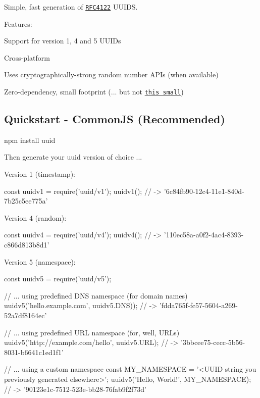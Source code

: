 Simple, fast generation of \href{http://www.ietf.org/rfc/rfc4122.txt}{\tt R\+F\+C4122} U\+U\+I\+DS.

Features\+:


\begin{DoxyItemize}
\item Support for version 1, 4 and 5 U\+U\+I\+Ds
\item Cross-\/platform
\item Uses cryptographically-\/strong random number A\+P\+Is (when available)
\item Zero-\/dependency, small footprint (... but not \href{https://gist.github.com/982883}{\tt this small})
\end{DoxyItemize}

\subsection*{Quickstart -\/ Common\+JS (Recommended)}


\begin{DoxyCode}
npm install uuid
\end{DoxyCode}


Then generate your uuid version of choice ...

Version 1 (timestamp)\+:


\begin{DoxyCode}
const uuidv1 = require('uuid/v1');
uuidv1(); // -> '6c84fb90-12c4-11e1-840d-7b25c5ee775a'
\end{DoxyCode}


Version 4 (random)\+:


\begin{DoxyCode}
const uuidv4 = require('uuid/v4');
uuidv4(); // -> '110ec58a-a0f2-4ac4-8393-c866d813b8d1'
\end{DoxyCode}


Version 5 (namespace)\+:


\begin{DoxyCode}
const uuidv5 = require('uuid/v5');

// ... using predefined DNS namespace (for domain names)
uuidv5('hello.example.com', uuidv5.DNS)); // -> 'fdda765f-fc57-5604-a269-52a7df8164ec'

// ... using predefined URL namespace (for, well, URLs)
uuidv5('http://example.com/hello', uuidv5.URL); // -> '3bbcee75-cecc-5b56-8031-b6641c1ed1f1'

// ... using a custom namespace
const MY\_NAMESPACE = '<UUID string you previously generated elsewhere>';
uuidv5('Hello, World!', MY\_NAMESPACE); // -> '90123e1c-7512-523e-bb28-76fab9f2f73d'
\end{DoxyCode}


